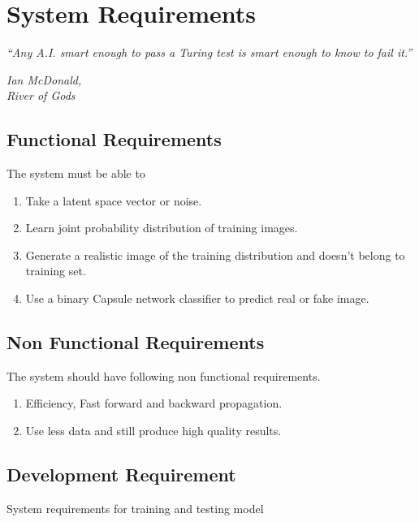\chapter{System Requirements}\label{ch:system_requirements}
\epigraph{\textit{\normalsize “Any A.I. smart enough to pass a Turing test is smart enough to know to fail it.”}}{\textit{ \normalsize Ian McDonald,\\ River of Gods}}

\section{Functional Requirements} %
\label{sec:functional_requirements}
The system must be able to
\begin{enumerate}
    \item Take a latent space vector or noise.
    \item Learn joint probability distribution of training images.
    \item Generate a realistic image of the training distribution and doesn't belong to training set.
    \item Use a binary Capsule network classifier to predict real or fake image.
\end{enumerate}
\section{Non Functional Requirements} %
\label{sec:non_functional_requirements}
The system should have following non functional requirements.
\begin{enumerate}
    \item Efficiency, Fast forward and backward propagation.
    \item Use less data and still produce high quality results.    
\end{enumerate}

\section{Development Requirement} %
\label{sec:development_requirement}
System requirements for training and testing model
